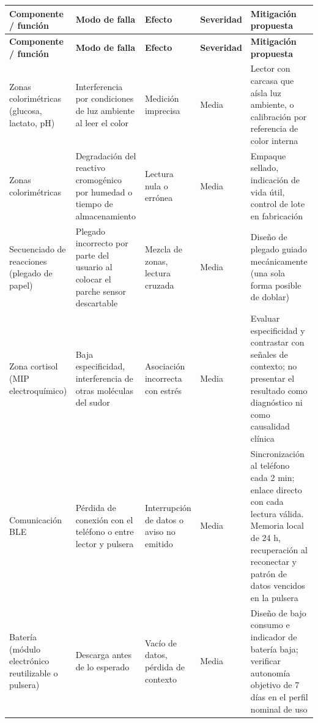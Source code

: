 {\footnotesize
\renewcommand{\arraystretch}{1.2}
\begin{longtable}{|>{\raggedright\arraybackslash}p{}|>{\raggedright\arraybackslash}p{}|>{\raggedright\arraybackslash}p{}|>{\raggedright\arraybackslash}p{}|>{\raggedright\arraybackslash}p{}|}
\hline
\textbf{Componente / función} & \textbf{Modo de falla} & \textbf{Efecto} & \textbf{Severidad} & \textbf{Mitigación propuesta} \\
\hline
\endfirsthead
\hline
\textbf{Componente / función} & \textbf{Modo de falla} & \textbf{Efecto} & \textbf{Severidad} & \textbf{Mitigación propuesta} \\
\hline
\endhead
Zonas colorimétricas (glucosa, lactato, pH) & Interferencia por condiciones de luz ambiente al leer el color & Medición imprecisa & Media & Lector con carcasa que aísla luz ambiente, o calibración por referencia de color interna \\
\hline
Zonas colorimétricas & Degradación del reactivo cromogénico por humedad o tiempo de almacenamiento & Lectura nula o errónea & Media & Empaque sellado, indicación de vida útil, control de lote en fabricación \\
\hline
Secuenciado de reacciones (plegado de papel) & Plegado incorrecto por parte del usuario al colocar el parche sensor descartable & Mezcla de zonas, lectura cruzada & Media & Diseño de plegado guiado mecánicamente (una sola forma posible de doblar) \\
\hline
Zona cortisol (MIP electroquímico) & Baja especificidad, interferencia de otras moléculas del sudor & Asociación incorrecta con estrés & Media & Evaluar especificidad y contrastar con señales de contexto; no presentar el resultado como diagnóstico ni como causalidad clínica \\
\hline
Comunicación BLE & Pérdida de conexión con el teléfono o entre lector y pulsera & Interrupción de datos o aviso no emitido & Media & Sincronización al teléfono cada 2 min; enlace directo con cada lectura válida. Memoria local de 24 h, recuperación al reconectar y patrón de datos vencidos en la pulsera \\
\hline
Batería (módulo electrónico reutilizable o pulsera) & Descarga antes de lo esperado & Vacío de datos, pérdida de contexto & Media & Diseño de bajo consumo e indicador de batería baja; verificar autonomía objetivo de 7 días en el perfil nominal de uso \\

\end{longtable}}
